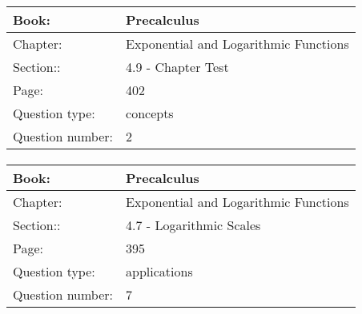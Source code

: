 \documentclass{article}
\begin{document}
        
            \paragraph{}
            \begin{tabularx}{1\textwidth}{
                    p{}
                    p{}
                }
                \toprule
                Book: & Precalculus
                \\
                \midrule
                Chapter: & Exponential and Logarithmic Functions
                \\
                \midrule
                Section:: & 4.9 - Chapter Test
                \\
                \midrule
                Page: & 402
                \\
                \midrule
                Question type: & concepts
                \\
                \midrule
                Question number: & 2
                \\
                \bottomrule
            \end{tabularx}
            
            \paragraph{}
            \begin{tabularx}{1\textwidth}{
                    p{}
                    p{}
                }
                \toprule
                Book: & Precalculus
                \\
                \midrule
                Chapter: & Exponential and Logarithmic Functions
                \\
                \midrule
                Section:: & 4.7 - Logarithmic Scales
                \\
                \midrule
                Page: & 395
                \\
                \midrule
                Question type: & applications
                \\
                \midrule
                Question number: & 7
                \\
                \bottomrule
            \end{tabularx}
            
\end{document}
